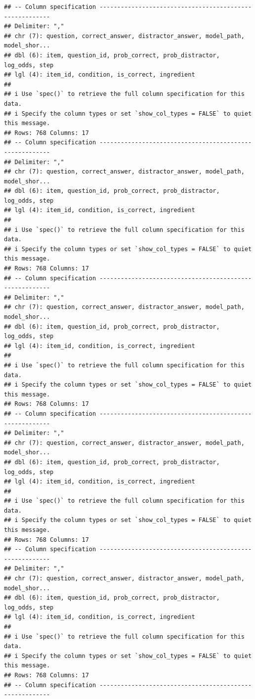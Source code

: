 \documentclass[
]{article}
\begin{document}
\begin{verbatim}
## -- Column specification --------------------------------------------------------
## Delimiter: ","
## chr (7): question, correct_answer, distractor_answer, model_path, model_shor...
## dbl (6): item, question_id, prob_correct, prob_distractor, log_odds, step
## lgl (4): item_id, condition, is_correct, ingredient
## 
## i Use `spec()` to retrieve the full column specification for this data.
## i Specify the column types or set `show_col_types = FALSE` to quiet this message.
## Rows: 768 Columns: 17
## -- Column specification --------------------------------------------------------
## Delimiter: ","
## chr (7): question, correct_answer, distractor_answer, model_path, model_shor...
## dbl (6): item, question_id, prob_correct, prob_distractor, log_odds, step
## lgl (4): item_id, condition, is_correct, ingredient
## 
## i Use `spec()` to retrieve the full column specification for this data.
## i Specify the column types or set `show_col_types = FALSE` to quiet this message.
## Rows: 768 Columns: 17
## -- Column specification --------------------------------------------------------
## Delimiter: ","
## chr (7): question, correct_answer, distractor_answer, model_path, model_shor...
## dbl (6): item, question_id, prob_correct, prob_distractor, log_odds, step
## lgl (4): item_id, condition, is_correct, ingredient
## 
## i Use `spec()` to retrieve the full column specification for this data.
## i Specify the column types or set `show_col_types = FALSE` to quiet this message.
## Rows: 768 Columns: 17
## -- Column specification --------------------------------------------------------
## Delimiter: ","
## chr (7): question, correct_answer, distractor_answer, model_path, model_shor...
## dbl (6): item, question_id, prob_correct, prob_distractor, log_odds, step
## lgl (4): item_id, condition, is_correct, ingredient
## 
## i Use `spec()` to retrieve the full column specification for this data.
## i Specify the column types or set `show_col_types = FALSE` to quiet this message.
## Rows: 768 Columns: 17
## -- Column specification --------------------------------------------------------
## Delimiter: ","
## chr (7): question, correct_answer, distractor_answer, model_path, model_shor...
## dbl (6): item, question_id, prob_correct, prob_distractor, log_odds, step
## lgl (4): item_id, condition, is_correct, ingredient
## 
## i Use `spec()` to retrieve the full column specification for this data.
## i Specify the column types or set `show_col_types = FALSE` to quiet this message.
## Rows: 768 Columns: 17
## -- Column specification --------------------------------------------------------

\end{verbatim}
\end{document}
